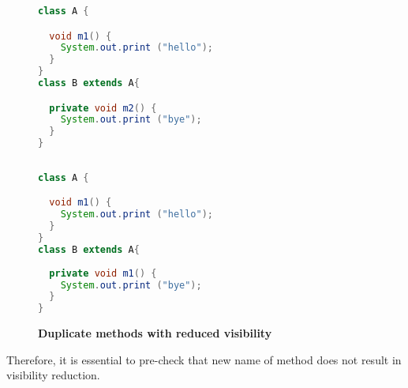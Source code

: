\begin{figure}[th]
\centering
\begin{minipage}[t]{0.7\linewidth}
\begin{lstlisting}[language=java, basicstyle=\scriptsize\ttfamily,frame=single]
class A {

  void m1() {
    System.out.print ("hello");
  }
}
class B extends A{

  private void m2() {
    System.out.print ("bye");
  }	
}
 
\end{lstlisting}
\end{minipage}
\hfill
\begin{minipage}[t]{0.7\linewidth}
\begin{lstlisting}[language=java, basicstyle=\scriptsize\ttfamily,frame=single]
class A {

  void m1() {
    System.out.print ("hello");
  }
}
class B extends A{
 
  private void m1() {
    System.out.print ("bye");
  }	
}

\end{lstlisting}
\end{minipage}
\caption{\textbf{Duplicate methods with reduced visibility}}
\label{fig:RmR3}
\end{figure}

Therefore, it is essential to pre-check that new name of method does not result in visibility reduction. 